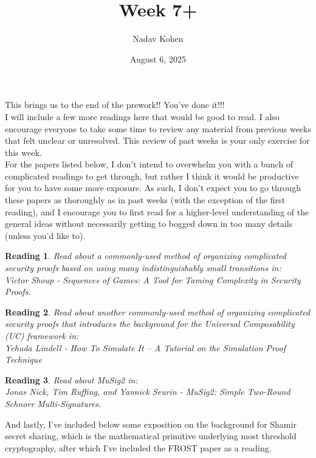 \documentclass[12pt]{article}
\newtheorem{reading}{Reading}
\theoremstyle{definition}
\theoremstyle{remark}
\theoremstyle{definition}
\begin{document}
\title{Week 7+}
\author{Nadav Kohen}
\date{August 6, 2025}
\maketitle

This brings us to the end of the prework!! You've done it!!!\\

I will include a few more readings here that would be good to read. I also encourage everyone to take some time to review any material from previous weeks that felt unclear or unresolved. This review of past weeks is your only exercise for this week.\\

For the papers listed below, I don't intend to overwhelm you with a bunch of complicated readings to get through, but rather I think it would be productive for you to have some more exposure. As such, I don't expect you to go through these papers as thoroughly as in past weeks (with the exception of the first reading), and I encourage you to first read for a higher-level understanding of the general ideas without necessarily getting to bogged down in too many details (unless you'd like to).

\begin{reading}
Read about a commonly-used method of organizing complicated security proofs based on using many indistinguishably small transitions in:\\
Victor Shoup - Sequences of Games: A Tool for Taming Complexity in Security Proofs.
\end{reading}

\begin{reading}
Read about another commonly-used method of organizing complicated security proofs that introduces the background for the Universal Composability (UC) framework in:\\
Yehuda Lindell - How To Simulate It -- A Tutorial on the Simulation Proof Technique
\end{reading}

\begin{reading}
Read about MuSig2 in:\\
Jonas Nick, Tim Ruffing, and Yannick Seurin - MuSig2: Simple Two-Round Schnorr Multi-Signatures.
\end{reading}

And lastly, I've included below some exposition on the background for Shamir secret sharing, which is the mathematical primitive underlying most threshold cryptography, after which I've included the FROST paper as a reading.\\
\end{document}
